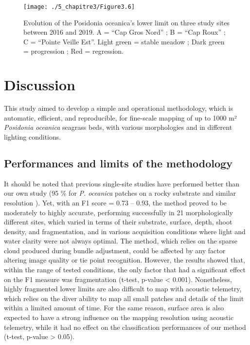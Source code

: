 \begin{figure}[H]
	\begin{center}
	\texttt{[image: ./5\_chapitre3/Figure3.6]}
		\caption[Evolution of the Posidonia oceanica’s lower limit on three study sites between 2016 and 2019.]{Evolution of the Posidonia oceanica’s lower limit on three study sites between 2016 and 2019. A = “Cap Gros Nord” ; B = “Cap Roux” ; C = “Pointe Veille Est”. Light green = stable meadow ; Dark green = progression ; Red = regression.}
	\label{figure3.6}
\end{center}
\end{figure}

\newpage

\section{Discussion}\label{chapitre3_4}
This study aimed to develop a simple and operational methodology, which is automatic, efficient, and reproducible, for fine-scale mapping of up to 1000 m² \textit{Posidonia oceanica} seagrass beds, with various morphologies and in different lighting conditions.

\subsection{Performances and limits of the methodology}
It should be noted that previous single-site studies have performed better than our own study (95 \% for \textit{P. oceanica} patches on a rocky substrate and similar resolution \citep{bonin-font_towards_2016}). Yet, with an F1 score = 0.73 – 0.93, the method proved to be moderately to highly accurate, performing successfully in 21 morphologically different sites, which varied in terms of their substrate, surface, depth, shoot density, and fragmentation, and in various acquisition conditions where light and water clarity were not always optimal. The method, which relies on the sparse cloud produced during bundle adjustment, could be affected by any factor altering image quality or tie point recognition. However, the results showed that, within the range of tested conditions, the only factor that had a significant effect on the F1 measure was fragmentation (t-test, p-value < 0.001). Nonetheless, highly fragmented lower limits are also difficult to map with acoustic telemetry, which relies on the diver ability to map all small patches and details of the limit within a limited amount of time. For the same reason, surface area is also expected to have a strong influence on the mapping resolution using acoustic telemetry, while it had no effect on the classification performances of our method (t-test, p-value > 0.05).

